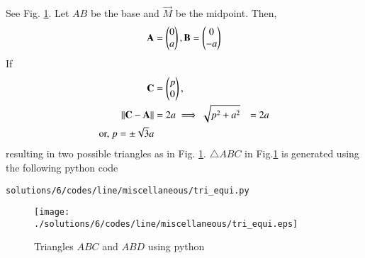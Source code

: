 See Fig. \ref{fig:3.12.6_tri_1}.  Let $AB$ be the base and $\vec{M}$ be the midpoint.
Then, 
\begin{align}
\mathbf{A} = \begin{pmatrix}0\\a\end{pmatrix},
\mathbf{B} = \begin{pmatrix}0\\-a\end{pmatrix}
\end{align}
If 
\begin{align}
\mathbf{C} &= \begin{pmatrix}p\\0\end{pmatrix}, 
\\
\left\lVert\mathbf{C}-\mathbf{A}\right\rVert &= 2a
\implies 
\sqrt{p^2+a^2} &= 2a
\\
\text{or, } p = \pm\sqrt{3}a
\end{align}
resulting in two possible triangles as in Fig. \ref{fig:3.12.6_tri_1}.
%
$\triangle{ABC}$ in Fig.\ref{fig:3.12.6_tri_1}  is generated using the following python code
\begin{lstlisting}
solutions/6/codes/line/miscellaneous/tri_equi.py
\end{lstlisting}
\begin{figure}[!ht]
\centering
\texttt{[image: ./solutions/6/codes/line/miscellaneous/tri\_equi.eps]}
\caption{Triangles $ABC$ and $ABD$ using python}
\label{fig:3.12.6_tri_1}
\end{figure} 



